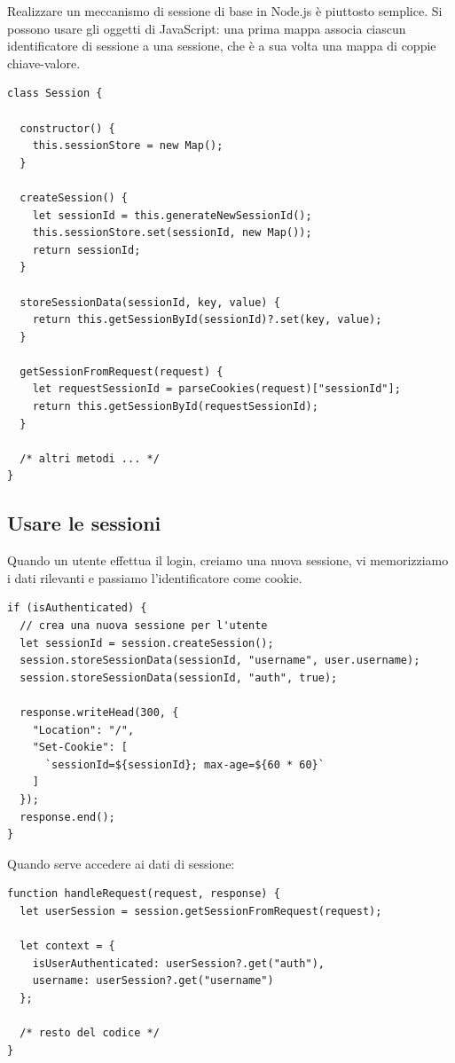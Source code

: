 Realizzare un meccanismo di sessione di base in Node.js è piuttosto semplice.
Si possono usare gli oggetti  di JavaScript: una prima mappa associa
ciascun identificatore di sessione a una sessione, che è a sua volta una mappa
di coppie chiave-valore.

\begin{lstlisting}[style=js, name=Session.js]
class Session {

  constructor() {
    this.sessionStore = new Map();
  }

  createSession() {
    let sessionId = this.generateNewSessionId();
    this.sessionStore.set(sessionId, new Map());
    return sessionId;
  }

  storeSessionData(sessionId, key, value) {
    return this.getSessionById(sessionId)?.set(key, value);
  }

  getSessionFromRequest(request) {
    let requestSessionId = parseCookies(request)["sessionId"];
    return this.getSessionById(requestSessionId);
  }

  /* altri metodi ... */
}
\end{lstlisting}

\subsection{Usare le sessioni}

Quando un utente effettua il login, creiamo una nuova sessione, vi memorizziamo
i dati rilevanti e passiamo l'identificatore come cookie.

\begin{lstlisting}[style=js, name=login.js]
if (isAuthenticated) {
  // crea una nuova sessione per l'utente
  let sessionId = session.createSession();
  session.storeSessionData(sessionId, "username", user.username);
  session.storeSessionData(sessionId, "auth", true);

  response.writeHead(300, {
    "Location": "/",
    "Set-Cookie": [
      `sessionId=${sessionId}; max-age=${60 * 60}`
    ]
  });
  response.end();
}
\end{lstlisting}

Quando serve accedere ai dati di sessione:

\begin{lstlisting}[style=js, name=router.js]
function handleRequest(request, response) {
  let userSession = session.getSessionFromRequest(request);

  let context = {
    isUserAuthenticated: userSession?.get("auth"),
    username: userSession?.get("username")
  };

  /* resto del codice */
}
\end{lstlisting}

